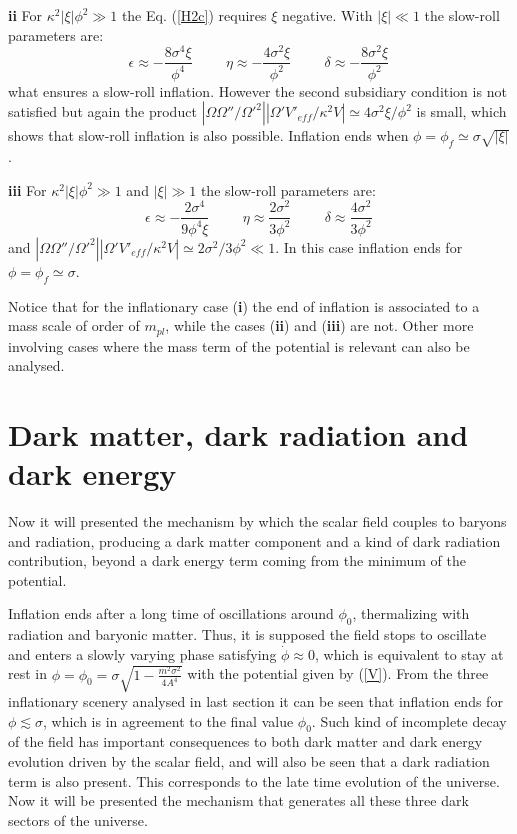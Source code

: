 \documentclass[preprintnumbers,amsmath,amssymb,nofootinbib]{revtex4}
\begin{document}
{\bf ii} For $\kappa^2|\xi| \phi^2 \gg 1$ the Eq. (\ref{H2c}) requires $\xi$ negative. With $|\xi| \ll 1$ the slow-roll parameters are:
\begin{equation}
    \epsilon \approx -\frac{8\sigma^4 \xi}{\phi^4}\hspace{1cm}  \eta \approx -\frac{4\sigma^2\xi}{\phi^2}\hspace{1cm} \delta \approx -\frac{8\sigma^2\xi}{\phi^2}\,\label{c2}
\end{equation}
what ensures a slow-roll inflation. However the second subsidiary condition is not satisfied but again the product $|\Omega\Omega''/\Omega'^2||\Omega'V'_{eff}/\kappa^2V| \simeq 4\sigma^2\xi/\phi^2$ is small, which shows that slow-roll inflation is also possible. Inflation ends when $\phi = \phi_f \simeq \sigma \sqrt{|\xi|}$. 

{\bf iii} For $\kappa^2|\xi| \phi^2 \gg 1$ and $|\xi|\gg 1$ the slow-roll parameters are:
\begin{equation}
    \epsilon \approx -\frac{2\sigma^4}{9\phi^4\xi}\hspace{1cm}  \eta \approx \frac{2\sigma^2}{3\phi^2}\hspace{1cm} \delta \approx \frac{4\sigma^2}{3\phi^2}\,\label{c3}
\end{equation}
and $|\Omega\Omega''/\Omega'^2||\Omega'V'_{eff}/\kappa^2V| \simeq 2\sigma^2/3\phi^2 \ll 1$. In this case inflation ends for $\phi = \phi_f \simeq \sigma$.

Notice that for the inflationary case ({\bf i}) the end of inflation is associated to a mass scale of order of $m_{pl}$, while the cases ({\bf ii}) and ({\bf iii}) are not. Other more involving cases where the mass term of the potential is relevant can also be analysed.

\section{Dark matter, dark radiation and dark energy}

Now it will presented the mechanism by which the scalar field couples to baryons and radiation, producing a dark matter component and a kind of dark radiation contribution, beyond a dark energy term coming from the minimum of the potential.

 Inflation ends after a long time of oscillations around $\phi_0$, thermalizing with radiation and baryonic matter. Thus, it is supposed the field stops to oscillate and enters a slowly varying phase satisfying $\dot{\phi}\approx 0$, which is equivalent to stay at rest in $\phi=\phi_0 = \sigma \sqrt{1-\frac{m^2\sigma^2}{4A^4}}$ with the potential given by (\ref{V}). From the three inflationary scenery analysed in last section it can be seen that inflation ends for $\phi \lesssim \sigma$, which is in agreement to the final value $\phi_0$. Such kind of incomplete decay of the field has important consequences to both dark matter and dark energy evolution driven by the scalar field, and will also be seen that a dark radiation term is also present. This corresponds to the late time evolution of the universe. Now it will be presented the mechanism that generates all these three dark sectors of the universe.
 
\end{document}
